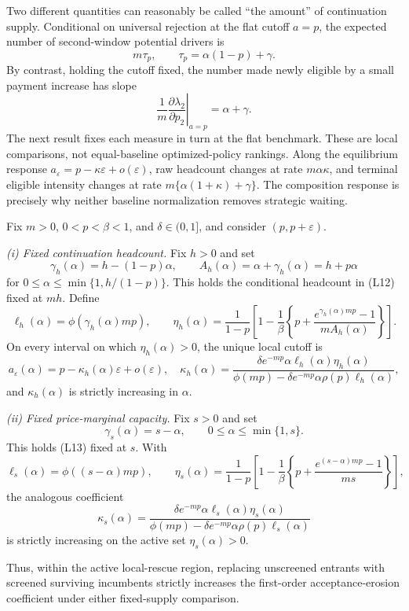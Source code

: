 \documentclass[mnsc,blindrev]{informs3}
\newcommand{\ph}{\phi}
\begin{document}
Two different quantities can reasonably be called ``the amount'' of
continuation supply.  Conditional on universal rejection at the flat cutoff
$a=p$, the expected number of second-window potential drivers is
\[
 m\tau_p,\qquad \tau_p=\alpha(1-p)+\gamma.                \tag{L12}
\]
By contrast, holding the cutoff fixed, the number made newly eligible by a
small payment increase has slope
\[
 \left.\frac1m\frac{\partial\lambda_2}{\partial p_2}
 \right|_{a=p}=\alpha+\gamma.                             \tag{L13}
\]
The next result fixes each measure in turn at the flat benchmark.  These are
local comparisons, not equal-baseline optimized-policy rankings.  Along the
equilibrium response $a_\varepsilon=p-\kappa\varepsilon+o(\varepsilon)$, raw
headcount changes at rate $m\alpha\kappa$, and terminal eligible intensity
changes at rate $m\{\alpha(1+\kappa)+\gamma\}$.  The composition response is
precisely why neither baseline normalization removes strategic waiting.

\begin{theorem}
\label{thm:composition}
Fix $m>0$, $0<p<\beta<1$, and $\delta\in(0,1]$, and consider
$(p,p+\varepsilon)$.

\textit{(i) Fixed continuation headcount.}  Fix $h>0$ and set
\[
 \gamma_h(\alpha)=h-(1-p)\alpha,\qquad
 A_h(\alpha)=\alpha+\gamma_h(\alpha)=h+p\alpha           \tag{L14}
\]
for $0\le\alpha\le\min\{1,h/(1-p)\}$.  This holds the conditional
headcount in (L12) fixed at $mh$.  Define
\[
 \ell_h(\alpha)=\ph(\gamma_h(\alpha)mp),\qquad
 \eta_h(\alpha)=\frac{1}{1-p}\left[
 1-\frac1\beta\left\{p+
 \frac{e^{\gamma_h(\alpha)mp}-1}{mA_h(\alpha)}\right\}
 \right].                                                 \tag{L15}
\]
On every interval on which $\eta_h(\alpha)>0$, the unique local cutoff is
\[
 a_\varepsilon(\alpha)
 =p-\kappa_h(\alpha)\varepsilon+o(\varepsilon),
 \quad
 \kappa_h(\alpha)=
 \frac{\delta e^{-mp}\alpha\ell_h(\alpha)\eta_h(\alpha)}
 {\ph(mp)-\delta e^{-mp}\alpha\rho(p)\ell_h(\alpha)},   \tag{L16}
\]
and $\kappa_h(\alpha)$ is strictly increasing in $\alpha$.

\textit{(ii) Fixed price-marginal capacity.}  Fix $s>0$ and set
\[
 \gamma_s(\alpha)=s-\alpha,\qquad
 0\le\alpha\le\min\{1,s\}.                              \tag{L17}
\]
This holds (L13) fixed at $s$.  With
\[
 \ell_s(\alpha)=\ph((s-\alpha)mp),\qquad
 \eta_s(\alpha)=\frac{1}{1-p}\left[
 1-\frac1\beta\left\{p+
 \frac{e^{(s-\alpha)mp}-1}{ms}\right\}
 \right],                                                 \tag{L18}
\]
the analogous coefficient
\[
 \kappa_s(\alpha)=
 \frac{\delta e^{-mp}\alpha\ell_s(\alpha)\eta_s(\alpha)}
 {\ph(mp)-\delta e^{-mp}\alpha\rho(p)\ell_s(\alpha)}   \tag{L19}
\]
is strictly increasing on the active set $\eta_s(\alpha)>0$.

Thus, within the active local-rescue region, replacing unscreened entrants
with screened surviving incumbents strictly increases the first-order
acceptance-erosion coefficient under either fixed-supply comparison.
\end{theorem}
\end{document}
